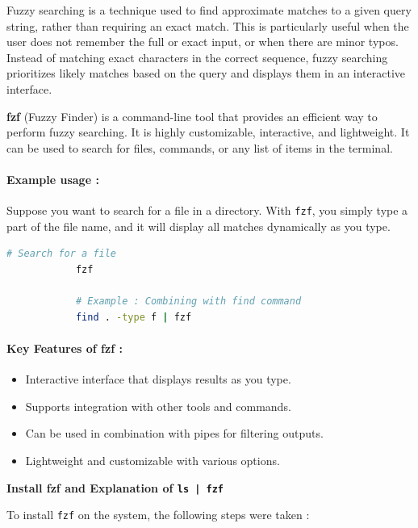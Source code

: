 \documentclass[12pt]{article}
\begin{document}
            Fuzzy searching is a technique used to find approximate matches to a given query string, rather than requiring an exact match. This is particularly useful when the user does not remember the full or exact input, or when there are minor typos. Instead of matching exact characters in the correct sequence, fuzzy searching prioritizes likely matches based on the query and displays them in an interactive interface.
            
            \textbf{fzf} (Fuzzy Finder) is a command-line tool that provides an efficient way to perform fuzzy searching. It is highly customizable, interactive, and lightweight. It can be used to search for files, commands, or any list of items in the terminal.
            
            \paragraph{Example usage :}
            Suppose you want to search for a file in a directory. With \texttt{fzf}, you simply type a part of the file name, and it will display all matches dynamically as you type.
            
            \begin{lstlisting}[language=bash]
            # Search for a file
            fzf
            
            # Example : Combining with find command
            find . -type f | fzf
            \end{lstlisting}
            
            \paragraph{Key Features of fzf :}
            \begin{itemize}
                \item Interactive interface that displays results as you type.
                \item Supports integration with other tools and commands.
                \item Can be used in combination with pipes for filtering outputs.
                \item Lightweight and customizable with various options.
            \end{itemize}


            \textbf{Install fzf and Explanation of \texttt{ls | fzf}}

            To install \texttt{fzf} on the system, the following steps were taken :
\end{document}

